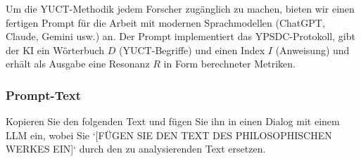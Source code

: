\documentclass[12pt,a4paper]{article}
\begin{document}
	Um die YUCT-Methodik jedem Forscher zugänglich zu machen, bieten wir einen fertigen Prompt für die Arbeit mit modernen Sprachmodellen (ChatGPT, Claude, Gemini usw.) an. Der Prompt implementiert das YPSDC-Protokoll, gibt der KI ein Wörterbuch \(D\) (YUCT-Begriffe) und einen Index \(I\) (Anweisung) und erhält als Ausgabe eine Resonanz \(R\) in Form berechneter Metriken.
	
	\subsubsection{Prompt-Text}
	
	Kopieren Sie den folgenden Text und fügen Sie ihn in einen Dialog mit einem LLM ein, wobei Sie `[FÜGEN SIE DEN TEXT DES PHILOSOPHISCHEN WERKES EIN]` durch den zu analysierenden Text ersetzen.
	
\end{document}

